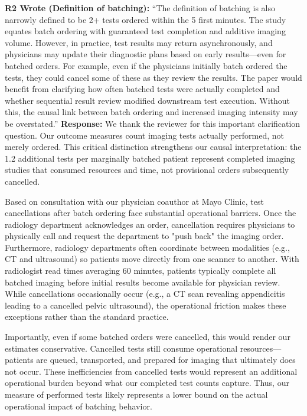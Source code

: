 \documentclass[11pt]{article}
\newenvironment{quote2}
{ \bigskip
\noindent
         \small\em
         \baselineskip=14pt
}
\newcommand{\1}{\hbox{\rm 1\kern-.35em 1}}
\begin{document}
\color{black}


\begin{quote2}
\textbf{R2 Wrote (Definition of batching):}  
``The definition of batching is also narrowly defined to be 2+ tests ordered within the 5 first minutes. The study equates batch ordering with guaranteed test completion and additive imaging volume. However, in practice, test results may return asynchronously, and physicians may update their diagnostic plans based on early results—even for batched orders. For example, even if the physicians initially batch ordered the tests, they could cancel some of these as they review the results. The paper would benefit from clarifying how often batched tests were actually completed and whether sequential result review modified downstream test execution. Without this, the causal link between batch ordering and increased imaging intensity may be overstated.” 
\end{quote2}

\noindent\textbf{Response:} \color{blue}
We thank the reviewer for this important clarification question. Our outcome measures count imaging tests actually performed, not merely ordered. This critical distinction strengthens our causal interpretation: the 1.2 additional tests per marginally batched patient represent completed imaging studies that consumed resources and time, not provisional orders subsequently cancelled.

Based on consultation with our physician coauthor at Mayo Clinic, test cancellations after batch ordering face substantial operational barriers. Once the radiology department acknowledges an order, cancellation requires physicians to physically call and request the department to "push back" the imaging order. Furthermore, radiology departments often coordinate between modalities (e.g., CT and ultrasound) so patients move directly from one scanner to another. With radiologist read times averaging 60 minutes, patients typically complete all batched imaging before initial results become available for physician review. While cancellations occasionally occur (e.g., a CT scan revealing appendicitis leading to a cancelled pelvic ultrasound), the operational friction makes these exceptions rather than the standard practice.

Importantly, even if some batched orders were cancelled, this would render our estimates conservative. Cancelled tests still consume operational resources—patients are queued, transported, and prepared for imaging that ultimately does not occur. These inefficiencies from cancelled tests would represent an additional operational burden beyond what our completed test counts capture. Thus, our measure of performed tests likely represents a lower bound on the actual operational impact of batching behavior.
\end{document}
